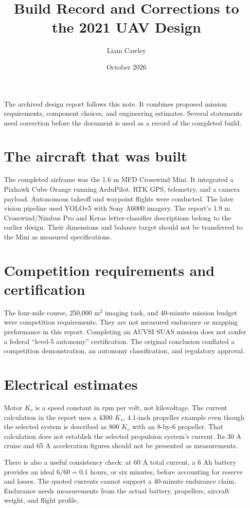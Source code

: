 \documentclass[11pt]{article}
\title{Build Record and Corrections to the 2021 UAV Design}
\author{Liam Cawley}
\date{October 2026}
\begin{document}
\maketitle

The archived design report follows this note. It combines proposed mission
requirements, component choices, and engineering estimates. Several statements
need correction before the document is used as a record of the completed build.

\section*{The aircraft that was built}
The completed airframe was the 1.6 m MFD Crosswind Mini. It integrated a Pixhawk
Cube Orange running ArduPilot, RTK GPS, telemetry, and a camera payload.
Autonomous takeoff and waypoint flights were conducted. The later vision
pipeline used YOLOv5 with Sony A6000 imagery.
The report's 1.9 m Crosswind/Nimbus Pro and Keras letter-classifier descriptions
belong to the earlier design. Their dimensions and balance target should not
be transferred to the Mini as measured specifications.

\section*{Competition requirements and certification}
The four-mile course, 250,000 m$^2$ imaging task, and 40-minute mission budget
were competition requirements. They are not measured endurance or mapping
performance in this report. Completing an AUVSI SUAS mission does not confer a
federal ``level-5 autonomy'' certification. The original conclusion conflated a
competition demonstration, an autonomy classification, and regulatory approval.

\section*{Electrical estimates}
Motor $K_v$ is a speed constant in rpm per volt, not kilovoltage. The current
calculation in the report uses a 4300 $K_v$, 4.1-inch propeller example even
though the selected system is described as 800 $K_v$ with an 8-by-6 propeller.
That calculation does not establish the selected propulsion system's current.
Its 30 A cruise and 65 A acceleration figures should not be presented as
measurements.

There is also a useful consistency check: at 60 A total current, a 6 Ah battery
provides an ideal $6/60=0.1$ hours, or six minutes, before accounting for reserve
and losses. The quoted currents cannot support a 40-minute endurance claim.
Endurance needs measurements from the actual battery, propellers, aircraft
weight, and flight profile.
\end{document}
